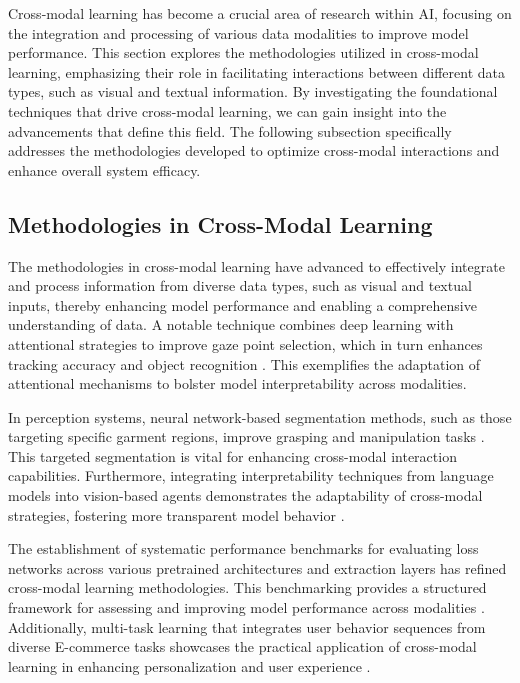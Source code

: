 Cross-modal learning has become a crucial area of research within AI, focusing on the integration and processing of various data modalities to improve model performance. This section explores the methodologies utilized in cross-modal learning, emphasizing their role in facilitating interactions between different data types, such as visual and textual information. By investigating the foundational techniques that drive cross-modal learning, we can gain insight into the advancements that define this field. The following subsection specifically addresses the methodologies developed to optimize cross-modal interactions and enhance overall system efficacy.

\subsection{Methodologies in Cross-Modal Learning} \label{subsec:Methodologies in Cross-Modal Learning}

The methodologies in cross-modal learning have advanced to effectively integrate and process information from diverse data types, such as visual and textual inputs, thereby enhancing model performance and enabling a comprehensive understanding of data. A notable technique combines deep learning with attentional strategies to improve gaze point selection, which in turn enhances tracking accuracy and object recognition \cite{denil2011learningattenddeeparchitectures}. This exemplifies the adaptation of attentional mechanisms to bolster model interpretability across modalities.

In perception systems, neural network-based segmentation methods, such as those targeting specific garment regions, improve grasping and manipulation tasks \cite{chen2023learninggraspclothingstructural}. This targeted segmentation is vital for enhancing cross-modal interaction capabilities. Furthermore, integrating interpretability techniques from language models into vision-based agents demonstrates the adaptability of cross-modal strategies, fostering more transparent model behavior \cite{jucys2024interpretabilityactionexploratoryanalysis}.

The establishment of systematic performance benchmarks for evaluating loss networks across various pretrained architectures and extraction layers has refined cross-modal learning methodologies. This benchmarking provides a structured framework for assessing and improving model performance across modalities \cite{pihlgren2024systematicperformanceanalysisdeep}. Additionally, multi-task learning that integrates user behavior sequences from diverse E-commerce tasks showcases the practical application of cross-modal learning in enhancing personalization and user experience \cite{ni2018perceiveusersdepthlearning}.


